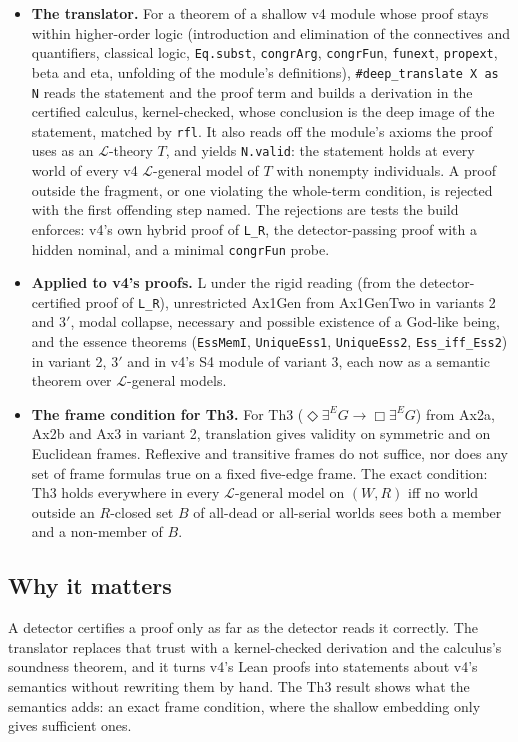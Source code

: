 \documentclass{article}
\begin{document}
\begin{itemize}
\item \textbf{The translator.} For a theorem of a shallow v4 module whose proof stays within higher-order logic (introduction and elimination of the connectives and quantifiers, classical logic, \texttt{Eq.subst}, \texttt{congrArg}, \texttt{congrFun}, \texttt{funext}, \texttt{propext}, beta and eta, unfolding of the module's definitions), \texttt{\#deep\_translate X as N} reads the statement and the proof term and builds a derivation in the certified calculus, kernel-checked, whose conclusion is the deep image of the statement, matched by \texttt{rfl}. It also reads off the module's axioms the proof uses as an $\mathcal L$-theory $T$, and yields \texttt{N.valid}: the statement holds at every world of every v4 $\mathcal L$-general model of $T$ with nonempty individuals. A proof outside the fragment, or one violating the whole-term condition, is rejected with the first offending step named. The rejections are tests the build enforces: v4's own hybrid proof of \texttt{L\_R}, the detector-passing proof with a hidden nominal, and a minimal \texttt{congrFun} probe.
\item \textbf{Applied to v4's proofs.} L under the rigid reading (from the detector-certified proof of \texttt{L\_R}), unrestricted Ax1Gen from Ax1GenTwo in variants 2 and 3$'$, modal collapse, necessary and possible existence of a God-like being, and the essence theorems (\texttt{EssMemI}, \texttt{UniqueEss1}, \texttt{UniqueEss2}, \texttt{Ess\_iff\_Ess2}) in variant 2, 3$'$ and in v4's S4 module of variant 3, each now as a semantic theorem over $\mathcal L$-general models.
\item \textbf{The frame condition for Th3.} For Th3 ($\Diamond\exists^E G\to\Box\exists^E G$) from Ax2a, Ax2b and Ax3 in variant 2, translation gives validity on symmetric and on Euclidean frames. Reflexive and transitive frames do not suffice, nor does any set of frame formulas true on a fixed five-edge frame. The exact condition: Th3 holds everywhere in every $\mathcal L$-general model on $(W,R)$ iff no world outside an $R$-closed set $B$ of all-dead or all-serial worlds sees both a member and a non-member of $B$.
\end{itemize}

\subsection*{Why it matters}

A detector certifies a proof only as far as the detector reads it correctly. The translator
replaces that trust with a kernel-checked derivation and the calculus's soundness theorem, and
it turns v4's Lean proofs into statements about v4's semantics without rewriting them by hand.
The Th3 result shows what the semantics adds: an exact frame condition, where the shallow
embedding only gives sufficient ones.
\end{document}
